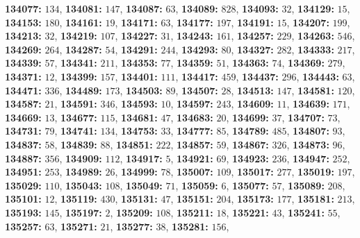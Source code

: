 \textsf{\bfseries 134077:} $134$, \textsf{\bfseries 134081:} $147$, \textsf{\bfseries 134087:} $63$, \textsf{\bfseries 134089:} $828$, \textsf{\bfseries 134093:} $32$, \textsf{\bfseries 134129:} $15$, \textsf{\bfseries 134153:} $180$, \textsf{\bfseries 134161:} $19$, \textsf{\bfseries 134171:} $63$, \textsf{\bfseries 134177:} $197$, \textsf{\bfseries 134191:} $15$, \textsf{\bfseries 134207:} $199$, \textsf{\bfseries 134213:} $32$, \textsf{\bfseries 134219:} $107$, \textsf{\bfseries 134227:} $31$, \textsf{\bfseries 134243:} $161$, \textsf{\bfseries 134257:} $229$, \textsf{\bfseries 134263:} $546$, \textsf{\bfseries 134269:} $264$, \textsf{\bfseries 134287:} $54$, \textsf{\bfseries 134291:} $244$, \textsf{\bfseries 134293:} $80$, \textsf{\bfseries 134327:} $282$, \textsf{\bfseries 134333:} $217$, \textsf{\bfseries 134339:} $57$, \textsf{\bfseries 134341:} $211$, \textsf{\bfseries 134353:} $77$, \textsf{\bfseries 134359:} $51$, \textsf{\bfseries 134363:} $74$, \textsf{\bfseries 134369:} $279$, \textsf{\bfseries 134371:} $12$, \textsf{\bfseries 134399:} $157$, \textsf{\bfseries 134401:} $111$, \textsf{\bfseries 134417:} $459$, \textsf{\bfseries 134437:} $296$, \textsf{\bfseries 134443:} $63$, \textsf{\bfseries 134471:} $336$, \textsf{\bfseries 134489:} $173$, \textsf{\bfseries 134503:} $89$, \textsf{\bfseries 134507:} $28$, \textsf{\bfseries 134513:} $147$, \textsf{\bfseries 134581:} $120$, \textsf{\bfseries 134587:} $21$, \textsf{\bfseries 134591:} $346$, \textsf{\bfseries 134593:} $10$, \textsf{\bfseries 134597:} $243$, \textsf{\bfseries 134609:} $11$, \textsf{\bfseries 134639:} $171$, \textsf{\bfseries 134669:} $13$, \textsf{\bfseries 134677:} $115$, \textsf{\bfseries 134681:} $47$, \textsf{\bfseries 134683:} $20$, \textsf{\bfseries 134699:} $37$, \textsf{\bfseries 134707:} $73$, \textsf{\bfseries 134731:} $79$, \textsf{\bfseries 134741:} $134$, \textsf{\bfseries 134753:} $33$, \textsf{\bfseries 134777:} $85$, \textsf{\bfseries 134789:} $485$, \textsf{\bfseries 134807:} $93$, \textsf{\bfseries 134837:} $58$, \textsf{\bfseries 134839:} $88$, \textsf{\bfseries 134851:} $222$, \textsf{\bfseries 134857:} $59$, \textsf{\bfseries 134867:} $326$, \textsf{\bfseries 134873:} $96$, \textsf{\bfseries 134887:} $356$, \textsf{\bfseries 134909:} $112$, \textsf{\bfseries 134917:} $5$, \textsf{\bfseries 134921:} $69$, \textsf{\bfseries 134923:} $236$, \textsf{\bfseries 134947:} $252$, \textsf{\bfseries 134951:} $253$, \textsf{\bfseries 134989:} $26$, \textsf{\bfseries 134999:} $78$, \textsf{\bfseries 135007:} $109$, \textsf{\bfseries 135017:} $277$, \textsf{\bfseries 135019:} $197$, \textsf{\bfseries 135029:} $110$, \textsf{\bfseries 135043:} $108$, \textsf{\bfseries 135049:} $71$, \textsf{\bfseries 135059:} $6$, \textsf{\bfseries 135077:} $57$, \textsf{\bfseries 135089:} $208$, \textsf{\bfseries 135101:} $12$, \textsf{\bfseries 135119:} $430$, \textsf{\bfseries 135131:} $47$, \textsf{\bfseries 135151:} $204$, \textsf{\bfseries 135173:} $177$, \textsf{\bfseries 135181:} $213$, \textsf{\bfseries 135193:} $145$, \textsf{\bfseries 135197:} $2$, \textsf{\bfseries 135209:} $108$, \textsf{\bfseries 135211:} $18$, \textsf{\bfseries 135221:} $43$, \textsf{\bfseries 135241:} $55$, \textsf{\bfseries 135257:} $63$, \textsf{\bfseries 135271:} $21$, \textsf{\bfseries 135277:} $38$, \textsf{\bfseries 135281:} $156$, 
